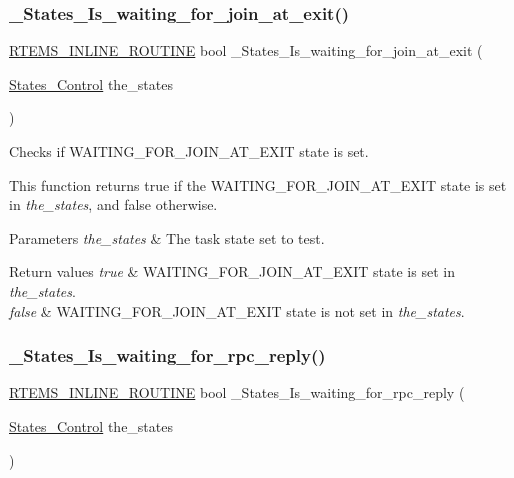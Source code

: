 \subsubsection{\texorpdfstring{\_States\_Is\_waiting\_for\_join\_at\_exit()}{\_States\_Is\_waiting\_for\_join\_at\_exit()}}
{\footnotesize\ttfamily \mbox{\hyperlink{group__RTEMSScoreBaseDefs_gac216239df231d5dbd15e3520b0b9313f}{R\+T\+E\+M\+S\+\_\+\+I\+N\+L\+I\+N\+E\+\_\+\+R\+O\+U\+T\+I\+NE}} bool \+\_\+\+States\+\_\+\+Is\+\_\+waiting\+\_\+for\+\_\+join\+\_\+at\+\_\+exit (\begin{DoxyParamCaption}\item[{\mbox{\hyperlink{group__RTEMSScoreStates_gaeebbea0bfca162709b124fd519cf99d3}{States\+\_\+\+Control}}}]{the\+\_\+states }\end{DoxyParamCaption})}



Checks if W\+A\+I\+T\+I\+N\+G\+\_\+\+F\+O\+R\+\_\+\+J\+O\+I\+N\+\_\+\+A\+T\+\_\+\+E\+X\+IT state is set. 

This function returns true if the W\+A\+I\+T\+I\+N\+G\+\_\+\+F\+O\+R\+\_\+\+J\+O\+I\+N\+\_\+\+A\+T\+\_\+\+E\+X\+IT state is set in {\itshape the\+\_\+states}, and false otherwise.


\begin{DoxyParams}{Parameters}
{\em the\+\_\+states} & The task state set to test.\\
\hline
\end{DoxyParams}

\begin{DoxyRetVals}{Return values}
{\em true} & W\+A\+I\+T\+I\+N\+G\+\_\+\+F\+O\+R\+\_\+\+J\+O\+I\+N\+\_\+\+A\+T\+\_\+\+E\+X\+IT state is set in {\itshape the\+\_\+states}. \\
\hline
{\em false} & W\+A\+I\+T\+I\+N\+G\+\_\+\+F\+O\+R\+\_\+\+J\+O\+I\+N\+\_\+\+A\+T\+\_\+\+E\+X\+IT state is not set in {\itshape the\+\_\+states}. \\
\hline
\end{DoxyRetVals}
\mbox{\label{group__RTEMSScoreStates_gae00cc74ed3a9ee8ba85ae406bcb1198f}} 
\subsubsection{\texorpdfstring{\_States\_Is\_waiting\_for\_rpc\_reply()}{\_States\_Is\_waiting\_for\_rpc\_reply()}}
{\footnotesize\ttfamily \mbox{\hyperlink{group__RTEMSScoreBaseDefs_gac216239df231d5dbd15e3520b0b9313f}{R\+T\+E\+M\+S\+\_\+\+I\+N\+L\+I\+N\+E\+\_\+\+R\+O\+U\+T\+I\+NE}} bool \+\_\+\+States\+\_\+\+Is\+\_\+waiting\+\_\+for\+\_\+rpc\+\_\+reply (\begin{DoxyParamCaption}\item[{\mbox{\hyperlink{group__RTEMSScoreStates_gaeebbea0bfca162709b124fd519cf99d3}{States\+\_\+\+Control}}}]{the\+\_\+states }\end{DoxyParamCaption})}




